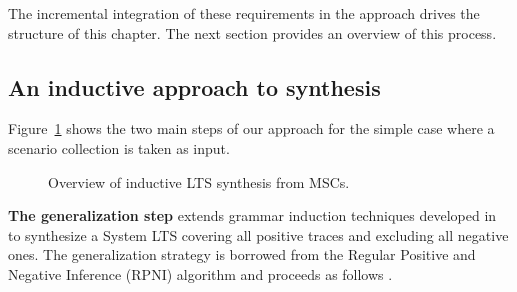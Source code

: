 The incremental integration of these requirements in the approach drives the structure of this chapter. The next section provides an overview of this process.


\subsection{An inductive approach to synthesis\label{subsection:inductive-synthesis-approach}}

Figure~\ref{image:inductive-synthesis-overview} shows the two main steps of our approach for the simple case where a scenario collection is taken as input. 

\begin{figure}[h]
\centering
{}
\caption{Overview of inductive LTS synthesis from MSCs.\label{image:inductive-synthesis-overview}}
\end{figure}

\noindent \textbf{The generalization step} extends grammar induction techniques developed in \cite{Oncina:1992} to synthesize a System LTS covering all positive traces and excluding all negative ones. The generalization strategy is borrowed from the Regular Positive and Negative Inference (RPNI) algorithm and proceeds as follows \cite{Oncina:1992}.

